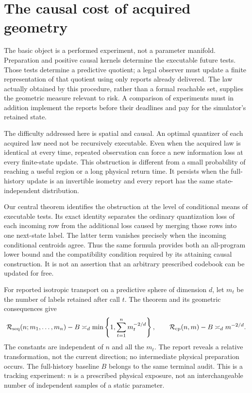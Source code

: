 \section{The causal cost of acquired geometry}
The basic object is a performed experiment, not a parameter manifold. Preparation and positive causal kernels determine the executable future tests. Those tests determine a predictive quotient; a legal observer must update a finite representation of that quotient using only reports already delivered. The law actually obtained by this procedure, rather than a formal reachable set, supplies the geometric measure relevant to risk. A comparison of experiments must in addition implement the reports before their deadlines and pay for the simulator's retained state.

The difficulty addressed here is spatial and causal. An optimal quantizer of each acquired law need not be recursively executable. Even when the acquired law is identical at every time, repeated observation can force a new information loss at every finite-state update. This obstruction is different from a small probability of reaching a useful region or a long physical return time. It persists when the full-history update is an invertible isometry and every report has the same state-independent distribution.

Our central theorem identifies the obstruction at the level of conditional means of executable tests. Its exact identity separates the ordinary quantization loss of each incoming row from the additional loss caused by merging those rows into one next-state label. The latter term vanishes precisely when the incoming conditional centroids agree. Thus the same formula provides both an all-program lower bound and the compatibility condition required by its attaining causal construction. It is not an assertion that an arbitrary prescribed codebook can be updated for free.

For reported isotropic transport on a predictive sphere of dimension $d$, let $m_t$ be the number of labels retained after call $t$. The theorem and its geometric consequences give
\[
 \mathcal R_{\rm seq}(n;m_1,\ldots,m_n)-B
 \asymp_d \min\left\{1,\sum_{t=1}^n m_t^{-2/d}\right\},
 \qquad
 \mathcal R_{\rm cp}(n,m)-B\asymp_d m^{-2/d}.
\]
The constants are independent of $n$ and all the $m_t$. The report reveals a relative transformation, not the current direction; no intermediate physical preparation occurs. The full-history baseline $B$ belongs to the same terminal audit. This is a tracking experiment: $n$ is a prescribed physical exposure, not an interchangeable number of independent samples of a static parameter.

